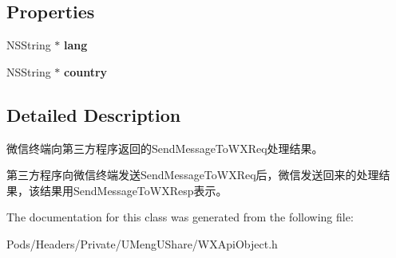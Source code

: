 \subsection*{Properties}
\begin{DoxyCompactItemize}
\item 
\mbox{\label{interface_send_message_to_w_x_resp_a0d754714b66702ba8acadb7c43ea4633}} 
N\+S\+String $\ast$ {\bfseries lang}
\item 
\mbox{\label{interface_send_message_to_w_x_resp_a90843f21303218efc7a48bc44c6ef210}} 
N\+S\+String $\ast$ {\bfseries country}
\end{DoxyCompactItemize}


\subsection{Detailed Description}
微信终端向第三方程序返回的\+Send\+Message\+To\+W\+X\+Req处理结果。 

第三方程序向微信终端发送\+Send\+Message\+To\+W\+X\+Req后，微信发送回来的处理结果，该结果用\+Send\+Message\+To\+W\+X\+Resp表示。 

The documentation for this class was generated from the following file\+:\begin{DoxyCompactItemize}
\item 
Pods/\+Headers/\+Private/\+U\+Meng\+U\+Share/W\+X\+Api\+Object.\+h\end{DoxyCompactItemize}
